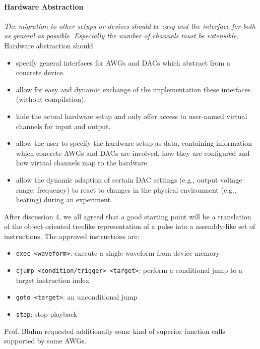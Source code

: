 \documentclass[a4paper,12pt]{article}
\begin{document}
\paragraph{Hardware Abstraction}
\textit{The migration to other setups or devices should be easy and the interface for both as general as possible. Especially the number of channels must be extensible.}\\
Hardware abstraction should
\begin{itemize} \itemsep-0.5pt
 \item specify general interfaces for AWGs and DACs which abstract from a concrete device.
 \item allow for easy and dynamic exchange of the implementation these interfaces (without compilation).
 \item hide the actual hardware setup and only offer access to user-named virtual channels for input and output.
 \item allow the user to specify the hardware setup as data, containing information which concrete AWGs and DACs are involved, how they are configured and how virtual channels map to the hardware.
 \item allow the dynamic adaption of certain DAC settings (e.g., output voltage range, frequency) to react to changes in the physical environment (e.g., heating) during an experiment.
\end{itemize}
After discussion 4, we all agreed that a good starting point will be a translation of the object oriented treelike representation of a pulse into a assembly-like set of instructions.
The approved instructions are:
\begin{itemize} \itemsep-0.5pt
 \item \texttt{exec <waveform>}: execute a single waveform from device memory
 \item \texttt{cjump <condition/trigger> <target>}: perform a conditional jump to a target instruction index
 \item \texttt{goto <target>}: an unconditional jump
 \item \texttt{stop}: stop playback
\end{itemize}
Prof. Bluhm requested additionally some kind of superior function calls supported by some AWGs.
\end{document}
